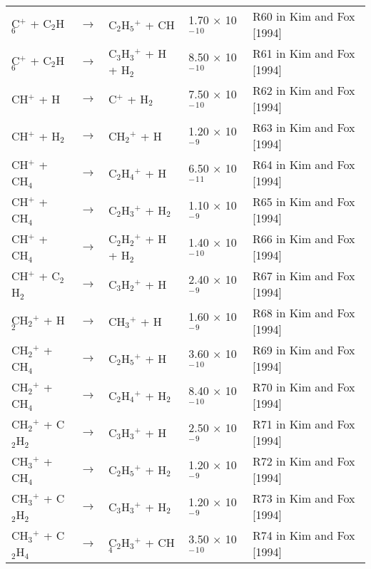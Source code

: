 \documentclass[10pt,a4paper]{jarticle}
\begin{document}
\begin{table}[htb]
{\begin{tabular}{lclll}
 C$^+$    + C$_2$H$_6$     & $\rightarrow$ & C$_2$H$_5$$^+$ + CH            & 1.70 $\times$ 10$^-$$^1$$^0$ & R60 in Kim and Fox [1994] \\
 C$^+$    + C$_2$H$_6$     & $\rightarrow$ & C$_3$H$_3$$^+$ + H   +  H$_2$     & 8.50 $\times$ 10$^-$$^1$$^0$ & R61 in Kim and Fox [1994] \\
 CH$^+$   + H        & $\rightarrow$ & C$^+$    + H$_2$            & 7.50 $\times$ 10$^-$$^1$$^0$ & R62 in Kim and Fox [1994] \\
 CH$^+$   + H$_2$       & $\rightarrow$ & CH$_2$$^+$  + H             & 1.20 $\times$ 10$^-$$^9$ & R63 in Kim and Fox [1994] \\
 CH$^+$   + CH$_4$      & $\rightarrow$ & C$_2$H$_4$$^+$ + H             & 6.50 $\times$ 10$^-$$^1$$^1$ & R64 in Kim and Fox [1994] \\
 CH$^+$   + CH$_4$      & $\rightarrow$ & C$_2$H$_3$$^+$ + H$_2$            & 1.10 $\times$ 10$^-$$^9$ & R65 in Kim and Fox [1994] \\
 CH$^+$   + CH$_4$      & $\rightarrow$ & C$_2$H$_2$$^+$ + H   +  H$_2$     & 1.40 $\times$ 10$^-$$^1$$^0$ & R66 in Kim and Fox [1994] \\
 CH$^+$   + C$_2$H$_2$     & $\rightarrow$ & C$_3$H$_2$$^+$ + H             & 2.40 $\times$ 10$^-$$^9$ & R67 in Kim and Fox [1994] \\
 CH$_2$$^+$  + H$_2$       & $\rightarrow$ & CH$_3$$^+$  + H             & 1.60 $\times$ 10$^-$$^9$ & R68 in Kim and Fox [1994] \\
 CH$_2$$^+$  + CH$_4$      & $\rightarrow$ & C$_2$H$_5$$^+$ + H             & 3.60 $\times$ 10$^-$$^1$$^0$ & R69 in Kim and Fox [1994] \\
 CH$_2$$^+$  + CH$_4$      & $\rightarrow$ & C$_2$H$_4$$^+$ + H$_2$            & 8.40 $\times$ 10$^-$$^1$$^0$ & R70 in Kim and Fox [1994] \\
 CH$_2$$^+$  + C$_2$H$_2$     & $\rightarrow$ & C$_3$H$_3$$^+$ + H             & 2.50 $\times$ 10$^-$$^9$ & R71 in Kim and Fox [1994] \\
 CH$_3$$^+$  + CH$_4$      & $\rightarrow$ & C$_2$H$_5$$^+$ + H$_2$            & 1.20 $\times$ 10$^-$$^9$ & R72 in Kim and Fox [1994] \\
 CH$_3$$^+$  + C$_2$H$_2$     & $\rightarrow$ & C$_3$H$_3$$^+$ + H$_2$            & 1.20 $\times$ 10$^-$$^9$ & R73 in Kim and Fox [1994] \\
 CH$_3$$^+$  + C$_2$H$_4$     & $\rightarrow$ & C$_2$H$_3$$^+$ + CH$_4$           & 3.50 $\times$ 10$^-$$^1$$^0$ & R74 in Kim and Fox [1994] \\

\end{tabular}}
\end{table}
\end{document}
